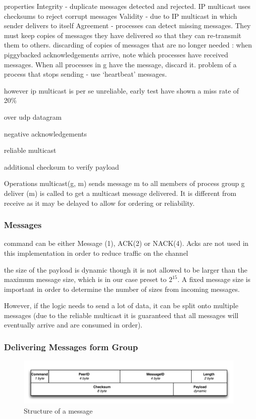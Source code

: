 properties
Integrity - duplicate messages detected and rejected.
IP multicast uses checksums to reject corrupt messages
Validity - due to IP multicast in which sender delivers to 
itself
Agreement - processes can detect missing messages. 
They must keep copies of messages they have 
delivered so that they can re-transmit them to others.
discarding of copies of messages that are no longer 
needed : 
when piggybacked acknowledgements arrive, note which processes 
have received messages. When all processes in g have the message, 
discard it.
problem of a process that stops sending - use ‘heartbeat’ messages.

however ip multicast is per se unreliable, early test have shown a miss rate of 20\%

over udp datagram

negative acknowledgements

reliable multicast

additional checksum to verify payload

Operations 
multicast(g, m) sends message m to all members of process group g
deliver (m) is called to get a multicast message delivered. It is different 
from receive as it may be delayed to allow for ordering or reliability.

\subsubsection{Messages}


command can be either Message (1), ACK(2) or NACK(4). 
Acks are not used in this implementation in order to reduce traffic on the channel 

the size of the payload is dynamic though it is not allowed to be larger than the maximum message size, which is in our case preset to $2^15$. A fixed message size is important in order to determine the number of sizes from incoming messages. 


However, if the logic needs to send a lot of data, it can be split onto multiple messages (due to the reliable multicast it is guaranteed that all messages will eventually arrive and are consumed in order).


\subsubsection{Delivering Messages form Group}


\begin{figure}[htbp]
    \centering
        \includegraphics[width=.9\textwidth]{figures/message.pdf}
    \caption{Structure of a message}
    \label{fig:figures_announcement}
\end{figure}

